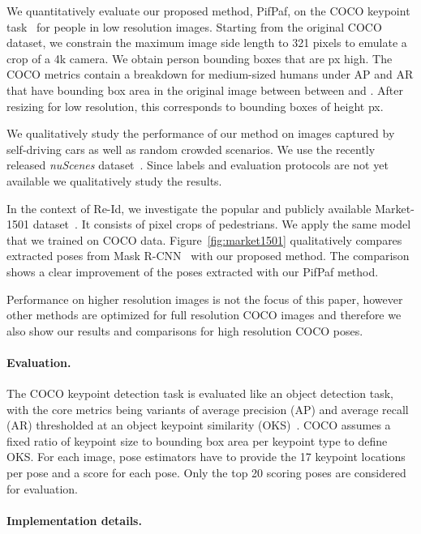 \documentclass[10pt,twocolumn,letterpaper]{article}
\begin{document}
We quantitatively evaluate our proposed method, PifPaf, on the COCO keypoint task~\cite{lin2014microsoft} for people in
low resolution images. Starting from the original COCO dataset, we constrain the maximum image side length to 321 pixels to emulate a crop of a 4k camera. We obtain person bounding boxes that are
px high. The COCO metrics contain a
breakdown for medium-sized humans under AP and AR that have bounding
box area in the original image between between  and
. After resizing for low resolution, this corresponds
to bounding boxes of height px.

We qualitatively study the performance of our meth\-od on images captured by
self-driving cars as well as random crowded scenarios. We use the recently
released \textit{nuScenes} dataset~\cite{nuscenes}. Since labels and
evaluation protocols are not yet available we qualitatively study the results.

In the context of Re-Id, we investigate the popular and publicly available Market-1501
dataset~\cite{zheng2015scalable}. It consists of  pixel crops of
pedestrians.
We apply the same model that we trained on COCO data.
Figure~\ref{fig:market1501} qualitatively compares extracted poses
from Mask R-CNN~\cite{he2017mask} with our proposed method. The comparison shows
a clear improvement of the poses extracted with our PifPaf method.

Performance on higher resolution images is not the focus of this paper, however
other methods are optimized for full resolution COCO images and therefore we also
show our results and comparisons for high resolution COCO poses.


\paragraph{Evaluation.}

The COCO keypoint detection task is evaluated like an object detection task, with the core
metrics being variants of average precision (AP) and average recall (AR) thresholded at an
object keypoint similarity (OKS)~\cite{lin2014microsoft}.
COCO assumes a fixed ratio of keypoint size to bounding box area per keypoint type to
define OKS.
For each image, pose estimators have to provide the 17 keypoint locations per pose and a score for each pose. Only the top 20 scoring poses are considered for evaluation.


\paragraph{Implementation details.}
\end{document}
